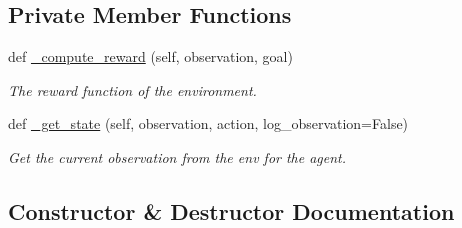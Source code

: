 \subsection*{Private Member Functions}
\begin{DoxyCompactItemize}
\item 
def \hyperlink{classtrifinger__simulation_1_1gym__wrapper_1_1envs_1_1trifinger__reach_1_1TriFingerReach_a05a8368ada911496c2b2e582aac976da}{\+\_\+compute\+\_\+reward} (self, observation, goal)
\begin{DoxyCompactList}\small\item\em The reward function of the environment. \end{DoxyCompactList}\item 
def \hyperlink{classtrifinger__simulation_1_1gym__wrapper_1_1envs_1_1trifinger__reach_1_1TriFingerReach_a1aab2e39d91a3fba25437b8497972460}{\+\_\+get\+\_\+state} (self, observation, action, log\+\_\+observation=False)
\begin{DoxyCompactList}\small\item\em Get the current observation from the env for the agent. \end{DoxyCompactList}\end{DoxyCompactItemize}


\subsection{Constructor \& Destructor Documentation}
\mbox{\label{classtrifinger__simulation_1_1gym__wrapper_1_1envs_1_1trifinger__reach_1_1TriFingerReach_afa5e38aa9079d1b271d291e3d197f423}} 
